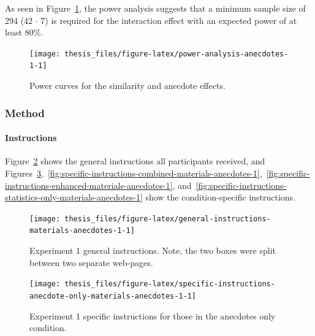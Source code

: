 \documentclass[a4paper, nobind, dvipsnames]{templates/ociamthesis}
\theoremstyle{definition}
\theoremstyle{definition}
\theoremstyle{definition}
\theoremstyle{definition}
\theoremstyle{remark}
\begin{document}
As seen in Figure~\ref{fig:power-analysis-anecdotes-1}, the power analysis
suggests that a minimum sample size of 294
(42 \(\cdot\) 7) is required for the interaction effect with
an expected power of at least 80\%.



\begin{figure}
\texttt{[image: thesis\_files/figure-latex/power-analysis-anecdotes-1-1]} \caption{Power curves for the similarity and anecdote effects.}\label{fig:power-analysis-anecdotes-1}
\end{figure}

\hypertarget{method-17}{%
\subsubsection{Method}\label{method-17}}

\hypertarget{instructions-materials-anecdotes-1-appendix}{%
\paragraph{Instructions}\label{instructions-materials-anecdotes-1-appendix}}

Figure~\ref{fig:general-instructions-materials-anecdotes-1} shows the general
instructions all participants received, and
Figures~\ref{fig:specific-instructions-anecdote-only-materials-anecdotes-1},~\ref{fig:specific-instructions-combined-materials-anecdotes-1},~\ref{fig:specific-instructions-enhanced-materials-anecdotes-1},
and~\ref{fig:specific-instructions-statistics-only-materials-anecdotes-1} show
the condition-specific instructions.



\begin{figure}
\texttt{[image: thesis\_files/figure-latex/general-instructions-materials-anecdotes-1-1]} \caption{Experiment 1 general instructions. Note, the two boxes were split between two separate web-pages.}\label{fig:general-instructions-materials-anecdotes-1}
\end{figure}



\begin{figure}
\texttt{[image: thesis\_files/figure-latex/specific-instructions-anecdote-only-materials-anecdotes-1-1]} \caption{Experiment 1 specific instructions for those in the anecdotes only condition.}\label{fig:specific-instructions-anecdote-only-materials-anecdotes-1}
\end{figure}
\end{document}

